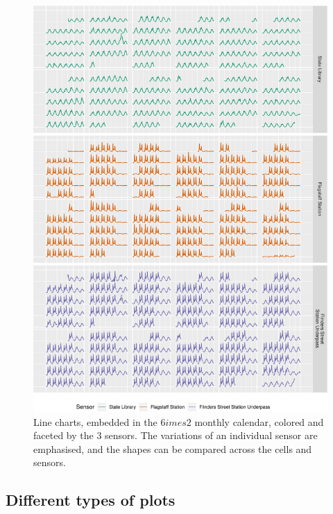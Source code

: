 \begin{Schunk}
\begin{figure}

{\centering \includegraphics[width=\textwidth]{figure/facet-1} 

}

\caption[Line charts, embedded in the $6    imes 2$ monthly calendar, colored and faceted by the 3 sensors]{Line charts, embedded in the $6     imes 2$ monthly calendar, colored and faceted by the 3 sensors. The variations of an individual sensor are emphasised, and the shapes can be compared across the cells and sensors.}\label{fig:facet}
\end{figure}
\end{Schunk}

\hypertarget{different-types-of-plots}{%
\subsection{Different types of plots}\label{different-types-of-plots}}

